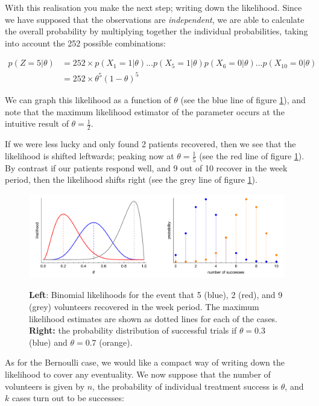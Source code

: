\documentclass[11pt,fullpage]{book}
\begin{document}
With this realisation you make the next step; writing down the likelihood. Since we have supposed that the observations are \textit{independent}, we are able to calculate the overall probability by multiplying together the individual probabilities, taking into account the 252 possible combinations:

\begin{align}
p(Z=5|\theta) &= 252\times p(X_1=1|\theta) ... p(X_5=1|\theta) p(X_6=0|\theta) ... p(X_10=0|\theta)\\
&= 252\times \theta^5 (1-\theta)^5
\end{align}

We can graph this likelihood as a function of $\theta$ (see the blue line of figure \ref{fig:Distributions_binomialClinicalTrial}), and note that the maximum likelihood estimator of the parameter occurs at the intuitive result of $\theta=\frac{1}{2}$.

If we were less lucky and only found 2 patients recovered, then we see that the likelihood is shifted leftwards; peaking now at $\theta=\frac{1}{5}$ (see the red line of figure \ref{fig:Distributions_binomialClinicalTrial}). By contrast if our patients respond well, and 9 out of 10 recover in the week period, then the likelihood shifts right (see the grey line of figure \ref{fig:Distributions_binomialClinicalTrial}).

\begin{figure}
\centering
\scalebox{0.5} 
{\includegraphics{Distributions_binomialClinicalTrial.pdf}}
\caption{\textbf{Left}: Binomial likelihoods for the event that 5 (blue), 2 (red), and 9 (grey) volunteers recovered in the week period. The maximum likelihood estimates are shown as dotted lines for each of the cases. \textbf{Right:} the probability distribution of successful trials if $\theta=0.3$ (blue) and $\theta=0.7$ (orange).}\label{fig:Distributions_binomialClinicalTrial}
\end{figure}

As for the Bernoulli case, we would like a compact way of writing down the likelihood to cover any eventuality. We now suppose that the number of volunteers is given by $n$, the probability of individual treatment success is $\theta$, and $k$ cases turn out to be successes:
\end{document}
